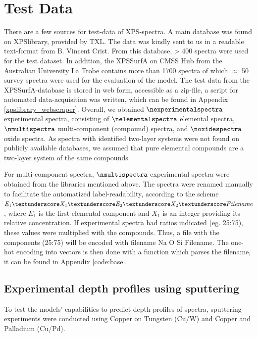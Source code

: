 
\section{Test Data}
\label{test_data}

There are a few sources for test-data of XPS-spectra. A main database was found on XPSlibrary, provided by TXL. The data was kindly sent to us in a readable text-format from B. Vincent Crist. From this database, > 400 spectra were used for the test dataset. In addition, the XPSSurfA on CMSS Hub from the Australian University La Trobe contains more than 1700 spectra of which $\approx$ 50 survey spectra were used for the evaluation of the model. The test data from the XPSSurfA-database is stored in web form, accessible as a zip-file, a script for automated data-acquisition was written, which can be found in Appendix \ref{xpslibrary_webscraper}.
Overall, we obtained $\nexperimentalspectra$ experimental spectra, consisting of $\nelementalspectra$ elemental spectra, $\nmultispectra$  multi-component (compound) spectra, and $\noxidespectra$ oxide spectra.
As spectra with identified two-layer systems were not found on publicly available databases, we assumed that pure elemental compounds are a two-layer system of the same compounds.

For multi-component spectra, $\nmultispectra$ experimental spectra were obtained from the libraries mentioned above. The spectra were renamed manually to facilitate the automatized label-readability, according to the scheme ${E_{1}\textunderscore X_{1} 	\textunderscore E_{2} 	\textunderscore X_{2} 	\textunderscore Filename}$, where $E_{1}$ is the first elemental component and $X_{1}$ is an integer providing its relative concentration. If experimental spectra had ratios indicated (eg. 25:75), these values were multiplied with the compounds. Thus, a file with the components  (25:75) will be encoded with filename Na  \textunderscore O  \textunderscore Si  \textunderscore Filename. The one-hot encoding into vectors is then done with a function which parses the filename, it can be found in Appendix \ref{code:base}.

\subsection{Experimental depth profiles using sputtering}
To test the models' capabilities to predict depth profiles of spectra, sputtering experiments were conducted using Copper on Tungsten (Cu/W) and Copper and Palladium (Cu/Pd). 


